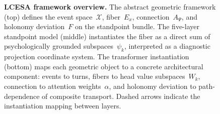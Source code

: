 \begin{figure}[t]
\caption{%
    \textbf{LCESA framework overview.}
    The abstract geometric framework (top) defines the event space~$\mathcal{X}$, fiber~$E_x$,
    connection~$A_\Psi$, and holonomy deviation~$F$ on the standpoint bundle.
    The five-layer standpoint model (middle) instantiates the fiber as a direct sum of
    psychologically grounded subspaces~$\psi_k$, interpreted as a diagnostic projection
    coordinate system.
    The transformer instantiation (bottom) maps each geometric object to a concrete
    architectural component: events to turns, fibers to head value subspaces~$W_k$,
    connection to attention weights~$\alpha$, and holonomy deviation to path-dependence of
    composite transport.
    Dashed arrows indicate the instantiation mapping between layers.
}
\label{fig:lcesa-framework}
\end{figure}
